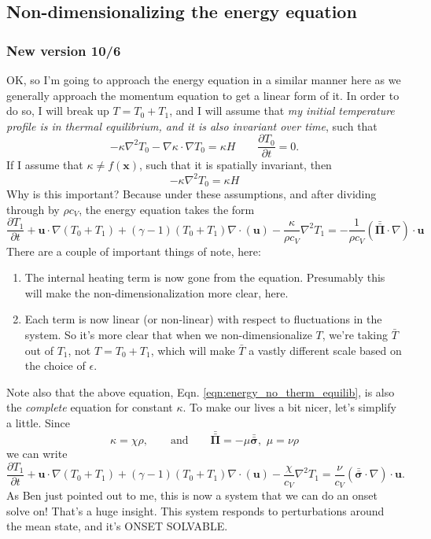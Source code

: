 \documentclass[aps, pre, onecolumn, nofootinbib, notitlepage, groupedaddress, amsfonts, amssymb, amsmath, longbibliography]{revtex4-1}
\newcommand{\Div}[1]{\ensuremath{\nabla\cdot\left( #1\right)}}
\newcommand{\grad}{\ensuremath{\nabla}}
\newcommand{\stressT}{\ensuremath{\bm{\bar{\bar{\Pi}}}}}
\newcommand{\lilstressT}{\ensuremath{\bm{\bar{\bar{\sigma}}}}}
\begin{document}
\subsection{Non-dimensionalizing the energy equation}

\subsubsection{New version 10/6}
OK, so I'm going to approach the energy equation in a similar manner here as we generally approach
the momentum equation to get a linear form of it.  In order to do so, I will break up
$T = T_0 + T_1$, and I will assume that \emph{my initial temperature profile is
in thermal equilibrium, and it is also invariant over time}, such that
\begin{equation}
-\kappa\grad^2 T_0 -\grad\kappa\cdot\grad T_0 = \kappa H \qquad \frac{\partial T_0}{\partial t} = 0.
\end{equation}
If I assume that $\kappa \neq f(\bm{x})$, such that it is spatially invariant,
then
$$
-\kappa\grad^2 T_0 = \kappa H
$$
Why is this important?  Because under these assumptions, and after dividing through
by $\rho c_V$, the energy equation takes the form
\begin{equation}
\frac{\partial T_1}{\partial t} + \bm{u}\cdot\grad(T_0 + T_1) + (\gamma - 1) (T_0 + T_1)
\Div{\bm{u}} - \frac{\kappa}{\rho c_V}\grad^2 T_1 = -\frac{1}{\rho c_V}(\stressT\cdot\grad)\cdot\bm{u}
\label{eqn:energy_no_therm_equilib}
\end{equation}
There are a couple of important things of note, here:
\begin{enumerate}
\item The internal heating term is now gone from the equation.  Presumably this will
make the non-dimensionalization more clear, here.
\item Each term is now linear (or non-linear) with respect to fluctuations in the
system.  So it's more clear that when we non-dimensionalize $T$, we're taking $\bar{T}$
out of $T_1$, not $T = T_0 + T_1$, which will make $\bar{T}$ a vastly different
scale based on the choice of $\epsilon$.
\end{enumerate}
Note also that the above equation, Eqn. \ref{eqn:energy_no_therm_equilib}, is also
the \emph{complete} equation for constant $\kappa$. To make our lives a bit nicer,
let's simplify a little.  Since
$$
\kappa = \chi\rho, \qquad \text{and} \qquad \stressT = -\mu\lilstressT,\,\,\mu = \nu\rho
$$
we can write
\begin{equation}
\boxed{
\frac{\partial T_1}{\partial t} + \bm{u}\cdot\grad(T_0 + T_1) + (\gamma - 1) (T_0 + T_1)
\Div{\bm{u}} - \frac{\chi}{c_V}\grad^2 T_1 = \frac{\nu}{c_V}(\lilstressT\cdot\grad)\cdot\bm{u}}.
\label{eqn:energy_no_therm_equilib_reduced}
\end{equation}
As Ben just pointed out to me, this is now a system that we can do an onset solve on!
That's a huge insight.  This system responds to perturbations around the mean state,
and it's ONSET SOLVABLE.
\end{document}
